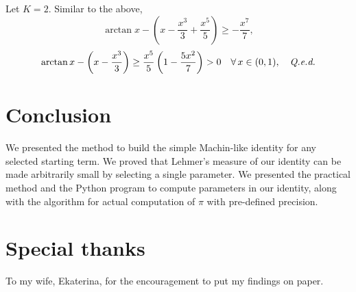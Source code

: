\documentclass[draft, 10pt]{article} %
\begin{document}
Let $K=2$. Similar to the above,
$$
\arctan x - \left( x - \dfrac{x^3}{3} + \dfrac{x^5}{5} \right) \ge -\dfrac{x^7}{7},
$$
$$
\arctan x - \left( x - \dfrac{x^3}{3} \right) \ge
    \dfrac{x^5}{5} \left( 1 - \dfrac{5x^2}{7} \right) > 0
    \quad \forall\, x \in (0,1), \quad\hbox{\qed}
$$

\section{Conclusion}

We presented the method to build the simple Machin-like identity for any selected
starting term. We proved that Lehmer's measure of our identity can be made
arbitrarily small by selecting a single parameter. We presented the practical method and
the Python program to compute parameters in our identity, along with the algorithm
for actual computation of $\pi$ with pre-defined precision.
 
\section{Special thanks}

\noindent
To my wife, Ekaterina, for the encouragement to put my findings on paper.

%
\end{document}
